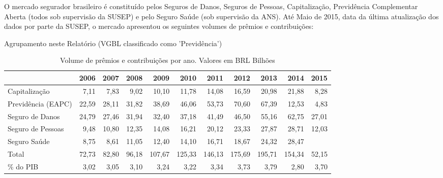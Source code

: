 \documentclass[../../relatorio.tex]{subfiles}
\begin{document}
O mercado segurador brasileiro é constituído pelos Seguros de Danos, Seguros de Pessoas, Capitalização, Previdência Complementar Aberta (todos sob supervisão da SUSEP) e pelo Seguro Saúde (sob supervisão da ANS).
Até Maio de 2015, data da última atualização dos dados por parte da SUSEP, o mercado apresentou os seguintes volumes de prêmios e contribuições:

Agrupamento neste Relatório (VGBL classificado como 'Previdência')
\renewcommand\thetable{II.1}
\begin{table}[H]
\centering
\begin{tabular}{lrrrrrrrrrr}
  \hline
 & 2006 & 2007 & 2008 & 2009 & 2010 & 2011 & 2012 & 2013 & 2014 & 2015 \\ 
  \hline
Capitalização & 7,11 & 7,83 & 9,02 & 10,10 & 11,78 & 14,08 & 16,59 & 20,98 & 21,88 & 8,28 \\ 
  Previdência (EAPC) & 22,59 & 28,11 & 31,82 & 38,69 & 46,06 & 53,73 & 70,60 & 67,39 & 12,53 & 4,83 \\ 
  Seguro de Danos & 24,79 & 27,46 & 31,94 & 32,40 & 37,18 & 41,49 & 46,50 & 55,16 & 62,75 & 27,01 \\ 
  Seguro de Pessoas & 9,48 & 10,80 & 12,35 & 14,08 & 16,21 & 20,12 & 23,33 & 27,87 & 28,71 & 12,03 \\ 
  Seguro Saúde & 8,75 & 8,61 & 11,05 & 12,40 & 14,10 & 16,71 & 18,67 & 24,32 & 28,47 &  \\ 
   \hline
Total & 72,73 & 82,80 & 96,18 & 107,67 & 125,33 & 146,13 & 175,69 & 195,71 & 154,34 & 52,15 \\ 
   \hline
\% do PIB & 3,02 & 3,05 & 3,10 & 3,24 & 3,22 & 3,34 & 3,73 & 3,79 & 2,80 & 3,70 \\ 
   \hline
\end{tabular}
\caption{Volume de prêmios e contribuições por ano. Valores em BRL Bilhões} 
\end{table}\renewcommand\thetable{II.1.r.dez.}
\end{document}
